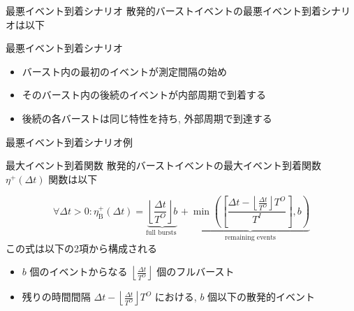 \begin{frame}{最悪イベント到着シナリオ}
    散発的バーストイベントの最悪イベント到着シナリオは以下
    \begin{block}{最悪イベント到着シナリオ}
        \begin{itemize}
            \item バースト内の最初のイベントが測定間隔の始め
            \item そのバースト内の後続のイベントが内部周期で到着する
            \item 後続の各バーストは同じ特性を持ち, 外部周期で到達する
        \end{itemize}
    \end{block}
\end{frame}

\begin{frame}{最悪イベント到着シナリオ例}
\end{frame}

\begin{frame}{最大イベント到着関数}
    散発的バーストイベントの最大イベント到着関数 $\eta^{+}(\Delta t)$ 関数は以下

    \begin{equation*}
        \forall \Delta t>0: \eta_{\mathrm{B}}^{+}(\Delta t)=\underbrace{\left\lfloor\frac{\Delta t}{T^{O}}\right\rfloor b}_{\text {full bursts }}+\underbrace{\min \left(\left[\frac{\Delta t-\left\lfloor\frac{\Delta t}{T^{O}}\right\rfloor T^{O}}{T^{I}}\right], b\right)}_{\text {remaining events}}
    \end{equation*}
    この式は以下の2項から構成される
    \begin{itemize}
        \item $b$ 個のイベントからなる $\left\lfloor\frac{\Delta t}{T^{O}}\right\rfloor$ 個のフルバースト
        \item 残りの時間間隔 $\Delta t-\left\lfloor\frac{\Delta t}{T^{O}}\right\rfloor T^{O}$ における, $b$ 個以下の散発的イベント
    \end{itemize}
\end{frame}



